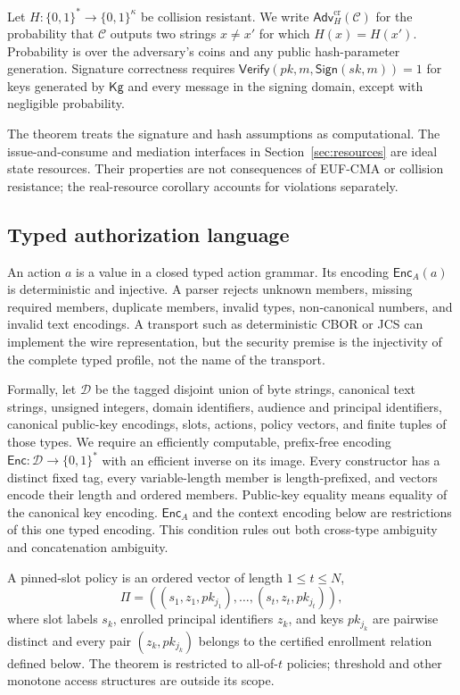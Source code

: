 \documentclass[10pt]{article}
\newcommand{\Adv}{\mathsf{Adv}}
\newcommand{\Enc}{\mathsf{Enc}}
\newcommand{\Sign}{\mathsf{Sign}}
\newcommand{\Verify}{\mathsf{Verify}}
\begin{document}
Let $H:\{0,1\}^*\rightarrow\{0,1\}^\kappa$ be collision resistant. We write
$\Adv^{\mathrm{cr}}_H(\mathcal C)$ for the probability that $\mathcal C$ outputs
two strings $x\neq x'$ for which $H(x)=H(x')$. Probability is over the
adversary's coins and any public hash-parameter generation. Signature
correctness requires
$\Verify(pk,m,\Sign(sk,m))=1$ for keys generated by $\mathsf{Kg}$ and every
message in the signing domain, except with negligible probability.

The theorem treats the signature and hash assumptions as computational. The
issue-and-consume and mediation interfaces in Section~\ref{sec:resources} are
ideal state resources. Their properties are not consequences of EUF-CMA or
collision resistance; the real-resource corollary accounts for violations
separately.

\subsection{Typed authorization language}

An action $a$ is a value in a closed typed action grammar. Its encoding
$\Enc_A(a)$ is deterministic and injective. A parser rejects unknown members,
missing required members, duplicate members, invalid types, non-canonical
numbers, and invalid text encodings. A transport such as deterministic CBOR or
JCS can implement the wire representation, but the security premise is the
injectivity of the complete typed profile, not the name of the transport.

Formally, let $\mathcal D$ be the tagged disjoint union of byte strings,
canonical text strings, unsigned integers, domain identifiers, audience and
principal identifiers, canonical public-key encodings, slots, actions, policy
vectors, and finite tuples of those types. We require an efficiently computable,
prefix-free encoding $\Enc:\mathcal D\rightarrow\{0,1\}^*$ with an efficient
inverse on its image. Every constructor has a distinct fixed tag, every
variable-length member is length-prefixed, and vectors encode their length and
ordered members. Public-key equality means equality of the canonical key
encoding. $\Enc_A$ and the context encoding below are restrictions of this one
typed encoding. This condition rules out both cross-type ambiguity and
concatenation ambiguity.

A pinned-slot policy is an ordered vector of length $1\leq t\leq N$,
\[
  \Pi=((s_1,z_1,pk_{j_1}),\ldots,(s_t,z_t,pk_{j_t})),
\]
where slot labels $s_k$, enrolled principal identifiers $z_k$, and keys
$pk_{j_k}$ are pairwise distinct and every pair $(z_k,pk_{j_k})$ belongs to the
certified enrollment relation defined below. The theorem is restricted to
all-of-$t$ policies; threshold and other monotone access structures are outside
its scope.
\end{document}
